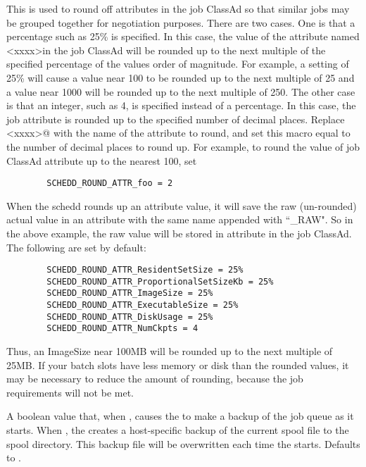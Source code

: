 \begin{description}
\label{param:ScheddRoundAttr}
\item[\Macro{SCHEDD\_ROUND\_ATTR\_<xxxx>}]
  This is used to round off attributes in
  the job ClassAd so that similar jobs may be grouped together for
  negotiation purposes.  There are two cases.  One is that a
  percentage such as 25\% is specified.  In this case, the value of
  the attribute named \verb@<xxxx>\@ in the job ClassAd will be
  rounded up to the next multiple of the specified percentage of the
  values order of magnitude.  For example, a setting of 25\% will
  cause a value near 100 to be rounded up to the next multiple of 25
  and a value near 1000 will be rounded up to the next multiple of
  250.  The other case is that an integer, such as 4, is specified
  instead of a percentage.  In this case, the job attribute is rounded
  up to the specified number of decimal places.
  Replace \verb@<xxxx>@ with the name of the attribute to round, and set this
  macro equal to the number of decimal places to round up.  For example, to
  round the value of job ClassAd attribute   up to the nearest
  100, set 
\begin{verbatim}
        SCHEDD_ROUND_ATTR_foo = 2
\end{verbatim}
  When the schedd rounds up an attribute value, it will save the raw 
  (un-rounded) actual value in an attribute with the same name appended
  with ``\_RAW".  So in the above example, the raw value will be stored
  in attribute  in the job ClassAd.
  The following are set by default:
\begin{verbatim}
        SCHEDD_ROUND_ATTR_ResidentSetSize = 25%
        SCHEDD_ROUND_ATTR_ProportionalSetSizeKb = 25%
        SCHEDD_ROUND_ATTR_ImageSize = 25%
        SCHEDD_ROUND_ATTR_ExecutableSize = 25%
        SCHEDD_ROUND_ATTR_DiskUsage = 25%
        SCHEDD_ROUND_ATTR_NumCkpts = 4
\end{verbatim}
  Thus, an ImageSize near 100MB will be rounded up to the next
  multiple of 25MB.  If your batch slots have less
  memory or disk than the rounded values, it may be necessary to
  reduce the amount of rounding, because the job requirements
  will not be met.

\label{param:ScheddBackupSpool}
\item[\Macro{SCHEDD\_BACKUP\_SPOOL}]
  A boolean value that, when , causes the
   to make a backup of the job queue as it starts.
  When , the  creates a host-specific
  backup of the current spool file to the spool directory.  This
  backup file will be overwritten each time the  starts.
  Defaults to .


\end{description}
